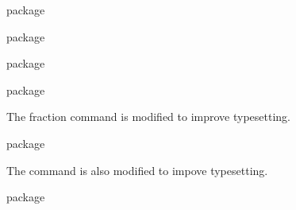 \documentclass[commonsets,load]{skdoc}
\providecommand\bar\relax \providecommand\d\relax
\begin{document}
  \begin{macro}{\arctan}
\begin{MacroCode}{package}
\RenewDocumentCommand{}
\end{MacroCode}
  \end{macro}
  \begin{macro}{\ln}
\begin{MacroCode}{package}
\RenewDocumentCommand{}
\end{MacroCode}
  \end{macro}
  \begin{macro}{\log}
\begin{MacroCode}{package}
\RenewDocumentCommand{}
\end{MacroCode}
  \end{macro}
  \begin{macro}{\exp}
\begin{MacroCode}{package}
\RenewDocumentCommand{}
\end{MacroCode}
  \end{macro}

  The fraction command is modified to improve typesetting.
  \begin{macro}{\frac}
\begin{MacroCode}{package}
\RenewDocumentCommand{}
\end{MacroCode}
  \end{macro}
 
  The  command is also modified to impove typesetting.
  \begin{macro}{\bar}
\begin{MacroCode}{package}
\RenewDocumentCommand\bar{m}{%
    \ensuremath{\mkern 1.5mu\overline{\mkern-1.5mu{#1}\mkern-1.5mu}\mkern 1.5mu}}
\end{MacroCode}
  \end{macro}
\end{document}
